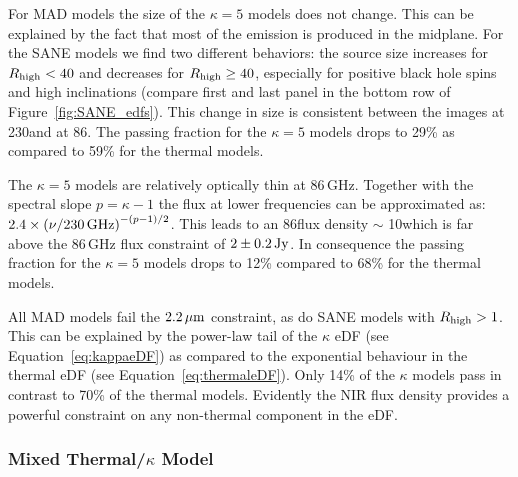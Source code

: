 
For MAD models the size of the $\kappa=5$ models does not change.
This can be explained by the fact that most of the emission is produced in the midplane.
For the SANE models we find two different behaviors: the source size increases for $R_\mathrm{high} < 40$ and decreases for $R_\mathrm{high} \geq 40$, especially for positive black hole spins and high inclinations (compare first and last panel in the bottom row of Figure~\ref{fig:SANE_edfs}).
This change in size is consistent between the images at 230\GHz and at 86\GHz.
The passing fraction for the $\kappa=5$ models drops to 29\% as compared to 59\% for the thermal models.


The $\kappa=5$ models are relatively optically thin at 86\,GHz.
Together with the spectral slope $p=\kappa-1$ the flux at lower frequencies can be approximated as: $2.4\times \left(\nu/230\,\mathrm{GHz}\right)^{-(p-1)/2}$.
This leads to an 86\GHz flux density $\sim$ 10\Jy which is far above the 86\,GHz flux constraint of $2\pm0.2\,\mathrm{Jy}$.
In consequence the passing fraction for the $\kappa=5$ models drops to 12\% compared to 68\% for the thermal models.


All MAD models fail the $2.2\,\mu\mathrm{m}$ constraint, as do SANE models with $R_\mathrm{high}>1$.
This can be explained by the power-law tail of the $\kappa$ eDF (see Equation~\ref{eq:kappaeDF}) as compared to the exponential behaviour in the thermal eDF (see Equation~\ref{eq:thermaleDF}).
Only 14\% of the $\kappa$ models pass in contrast to 70\% of the thermal models.  Evidently the NIR flux density provides a powerful constraint on any non-thermal component in the eDF.

\subsubsection{Mixed Thermal/\texorpdfstring{$\kappa$}{kappa} Model}

